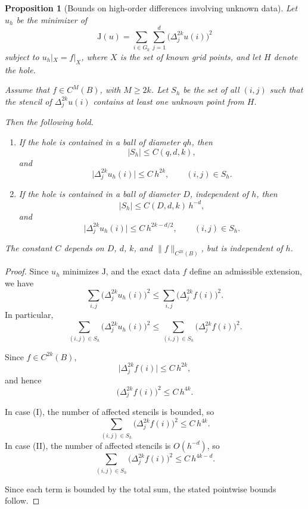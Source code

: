 \documentclass[11pt,oneside,reqno]{amsart}
\theoremstyle{plain}
\newtheorem{proposition}[theorem]{Proposition}
\numberwithin{equation}{section}
\begin{document}
\begin{proposition}[Bounds on high-order differences
involving unknown data]
Let $u_h$ be the minimizer of
\[
\mathrm{J}(u)
=
\sum_{i\in G_k}\sum_{j=1}^d
\bigl(\Delta_j^{2k}u(i)\bigr)^2
\]
subject to $u_h|_X = f|_X$,
where $X$ is the set of known grid points,
and let $H$ denote the hole.

Assume that $f\in C^M(B)$,
with $M\ge 2k$.
Let $S_h$ be the set of all $(i,j)$
such that the stencil of $\Delta_j^{2k}u(i)$
contains at least one unknown point from $H$.

Then the following hold.

\begin{enumerate}
\item[(I)]
If the hole is contained in a ball
of diameter $qh$, then
\[
|S_h|\le C(q,d,k),
\]
and
\[
\bigl|\Delta_j^{2k}u_h(i)\bigr|
\le C\,h^{2k},
\qquad (i,j)\in S_h.
\]

\item[(II)]
If the hole is contained in a ball
of diameter $D$, independent of $h$,
then
\[
|S_h|\le C(D,d,k)\,h^{-d},
\]
and
\[
\bigl|\Delta_j^{2k}u_h(i)\bigr|
\le C\,h^{2k-d/2},
\qquad (i,j)\in S_h.
\]
\end{enumerate}

The constant $C$ depends on
$D$, $d$, $k$,
and $\|f\|_{C^{2k}(B)}$,
but is independent of $h$.
\end{proposition}

\begin{proof}
Since $u_h$ minimizes $\mathrm{J}$,
and the exact data $f$ define an admissible extension,
we have
\[
\sum_{i,j}
\bigl(\Delta_j^{2k}u_h(i)\bigr)^2
\le
\sum_{i,j}
\bigl(\Delta_j^{2k}f(i)\bigr)^2.
\]
In particular,
\[
\sum_{(i,j)\in S_h}
\bigl(\Delta_j^{2k}u_h(i)\bigr)^2
\le
\sum_{(i,j)\in S_h}
\bigl(\Delta_j^{2k}f(i)\bigr)^2.
\]

Since $f\in C^{2k}(B)$,
\[
\bigl|\Delta_j^{2k}f(i)\bigr|
\le C\,h^{2k},
\]
and hence
\[
\bigl(\Delta_j^{2k}f(i)\bigr)^2
\le C\,h^{4k}.
\]

In case (I),
the number of affected stencils is bounded,
so
\[
\sum_{(i,j)\in S_h}
\bigl(\Delta_j^{2k}f(i)\bigr)^2
\le C\,h^{4k}.
\]
In case (II),
the number of affected stencils is $O(h^{-d})$,
so
\[
\sum_{(i,j)\in S_h}
\bigl(\Delta_j^{2k}f(i)\bigr)^2
\le C\,h^{4k-d}.
\]

Since each term is bounded by the total sum,
the stated pointwise bounds follow.
\end{proof}
\end{document}

